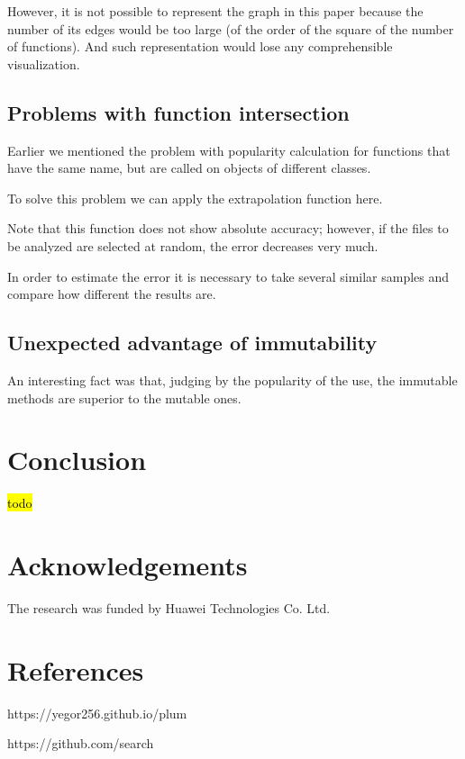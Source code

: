 \documentclass[anonymous,sigplan,review,11pt,nonacm,natbib=false]{acmart}
\begin{document}
    However, it is not possible to represent the graph in this paper because the number of its edges would be too large (of the order of the square of the number of functions). And such representation would lose any comprehensible visualization.

    \subsection{Problems with function intersection}

    Earlier we mentioned the problem with popularity calculation for functions that have the same name, but are called on objects of different classes.

    To solve this problem we can apply the extrapolation function here.

    Note that this function does not show absolute accuracy; however, if the files to be analyzed are selected at random, the error decreases very much.

    In order to estimate the error it is necessary to take several similar samples and compare how different the results are.

    \subsection{Unexpected advantage of immutability}

    An interesting fact was that, judging by the popularity of the use, the immutable methods are superior to the mutable ones.

    \section{Conclusion}\label{sec:conclusion}

    \hl{todo}

    \section{Acknowledgements}

    The research was funded by Huawei Technologies Co. Ltd.

    \section{References}

    https://yegor256.github.io/plum

    https://github.com/search
\end{document}
